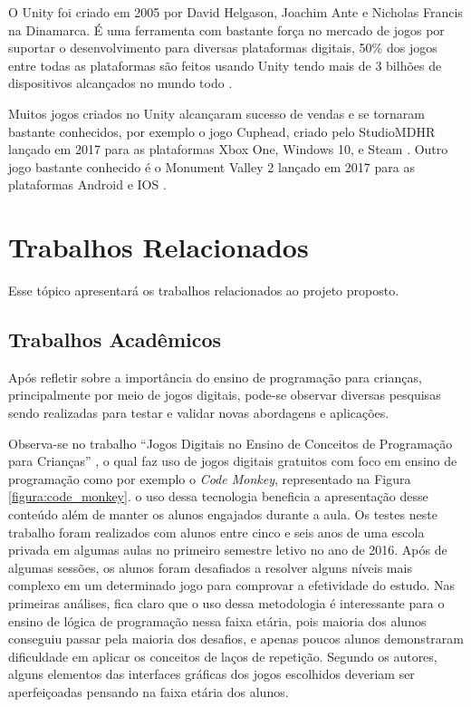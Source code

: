         O Unity foi criado em 2005 por David Helgason, Joachim Ante e Nicholas	
        Francis na Dinamarca. É uma ferramenta com bastante força no mercado de jogos por suportar o desenvolvimento para diversas plataformas digitais, 50\% dos jogos entre todas as plataformas são feitos usando Unity tendo mais de 3 bilhões de dispositivos alcançados no mundo todo \cite{dados_unity}.	

        Muitos jogos criados no Unity alcançaram sucesso de vendas e se tornaram bastante conhecidos, por exemplo o jogo Cuphead, criado pelo StudioMDHR lançado em 2017 para as plataformas Xbox One, Windows 10, e Steam \cite{cuphead}. Outro jogo bastante conhecido é o Monument Valley 2 lançado em 2017 para as plataformas Android e IOS \cite{monument_valley_2}.

\section{Trabalhos Relacionados}
Esse tópico apresentará os trabalhos relacionados ao projeto proposto.

\subsection{Trabalhos Acadêmicos}
Após refletir sobre a importância do ensino de programação para crianças, principalmente por meio de jogos digitais, pode-se observar diversas pesquisas sendo realizadas para testar e validar novas abordagens e aplicações. 

Observa-se no trabalho “Jogos Digitais no Ensino de Conceitos de Programação para Crianças” \cite{tadesco_2016}, o qual faz uso de jogos digitais gratuitos com foco em ensino de programação como por exemplo o \textit{Code Monkey}, representado na Figura \ref{figura:code_monkey}. o uso dessa tecnologia beneficia a apresentação desse conteúdo além de manter os alunos engajados durante a aula. Os testes neste trabalho foram realizados com alunos entre cinco e seis anos de uma escola privada em algumas aulas no primeiro semestre letivo no ano de 2016. Após de algumas sessões, os alunos foram desafiados a resolver alguns níveis mais complexo em um determinado jogo para comprovar a efetividade do estudo. Nas primeiras análises, fica claro que o uso dessa metodologia é  interessante para o ensino de lógica de programação nessa faixa etária, pois maioria dos alunos conseguiu passar pela maioria dos desafios, e apenas poucos alunos demonstraram dificuldade em aplicar os conceitos de laços de repetição. Segundo os autores, alguns elementos das interfaces gráficas dos jogos escolhidos deveriam ser aperfeiçoadas pensando na faixa etária dos alunos.

